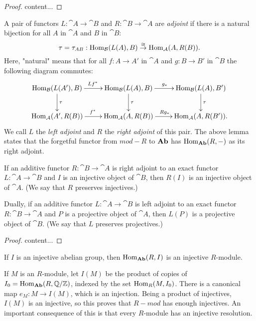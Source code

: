 \begin{proof}
	content...
\end{proof}

\begin{definition}
	A pair of functors $L:\cat{A}\rightarrow\cat{B}$ and $R:\cat{B}\rightarrow\cat{A}$ are \textit{adjoint} if there is a natural bijection for all $A$ in $\cat{A}$ and $B$ in $\cat{B}$:
	$$\tau = \tau_{AB}:\operatorname{Hom}_{\mathcal{B}}(L(A),B) \overset{\cong}{\rightarrow} \operatorname{Hom}_{\mathcal{A}}(A,R(B)).$$
	Here, "natural" means that for all $f:A\rightarrow A'$ in $\cat{A}$ and $g:B\rightarrow B'$ in $\cat{B}$ the following diagram commutes:
	\begin{align*}
		\xymatrix{
			\Hom_{\cat{B}}(L(A'),B) \ar[r]^{Lf^*} \ar[d]^{\tau} &\Hom_{\cat{B}}(L(A),B) \ar[r]^{g_*} \ar[d]^{\tau} &\Hom_{\cat{B}}(L(A),B') \ar[d]^{\tau} \\
			\Hom_{\cat{A}}(A',R(B)) \ar[r]^{f^*} &\Hom_{\cat{A}}(A,R(B)) \ar[r]^{Rg_*} &\Hom_{\cat{A}}(A,R(B')).
		}
	\end{align*}
	We call $L$ the \textit{left adjoint} and $R$ the \textit{right adjoint} of this pair.
	The above lemma states that the forgetful functor from $mod-R$ to $\textrm{\textup{\textbf{Ab}}}$ has $\operatorname{Hom}_{\textrm{\textup{\textbf{Ab}}}}(R,-)$ as its right adjoint.
\end{definition}

\begin{proposition}\label{PresInj}
	If an additive functor $R:\cat{B}\rightarrow\cat{A}$ is right adjoint to an exact functor $L:\cat{A}\rightarrow\cat{B}$ and $I$ is an injective object of $\cat{B}$, then $R(I)$ is an injective object of $\cat{A}$. (We say that $R$ preserves injectives.)
	
	Dually, if an additive functor $L:\cat{A}\rightarrow\cat{B}$ is left adjoint to an exact functor $R:\cat{B}\rightarrow\cat{A}$ and $P$ is a projective object of $\cat{A}$, then $L(P)$ is a projective object of $\cat{B}$. (We say that $L$ preserves projectives.)
\end{proposition}

\begin{proof}
	content...
\end{proof}

\begin{corollary}
	If $I$ is an injective abelian group, then $\operatorname{Hom}_{\textrm{\textup{\textbf{Ab}}}}(R,I)$ is an injective $R$-module.
\end{corollary}

\begin{exercise}
	If $M$ is an $R$-module, let $I(M)$ be the product of copies of $I_0=\operatorname{Hom}_{\textrm{\textup{\textbf{Ab}}}}(R,{\mathbb Q}/{\mathbb Z})$, indexed by the set $\operatorname{Hom}_R(M,I_0)$.
	There is a canonical map $e_M:M\rightarrow I(M)$, which is an injection.
	Being a product of injectives, $I(M)$ is an injective, so this proves that $R-mod$ has enough injectives.
	An important consequence of this is that every $R$-module has an injective resolution.
\end{exercise}


